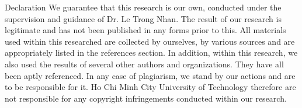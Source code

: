 \begin{preface}{Declaration}
  We guarantee that this research is our own, conducted under the supervision and guidance of Dr. Le Trong Nhan.
  The result of our research is legitimate and has not been published in any forms prior to this.
  All materials used within this researched are collected by ourselves, by various sources and are appropriately listed in the references section.
  In addition, within this research, we also used the results of several other authors and organizations.
  They have all been aptly referenced.
  In any case of plagiarism, we stand by our actions and are to be responsible for it.
  Ho Chi Minh City University of Technology therefore are not responsible for any copyright infringements conducted within our research.
\end{preface}
